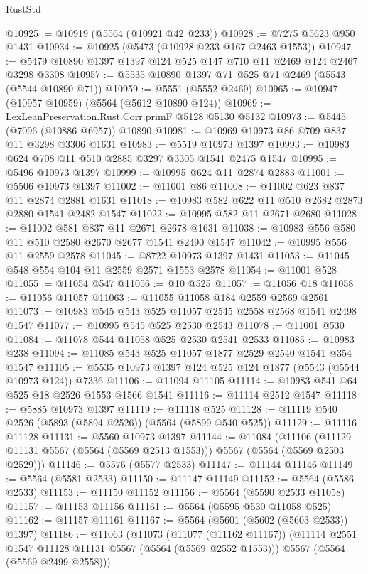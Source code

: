 \begin{lexlean}{RustStd}
\begin{coremodule}
@10925 := @10919 (@5564 (@10921 @42 @233))
@10928 := @7275 @5623 @950 @1431
@10934 := @10925 (@5473 (@10928 @233 @167 @2463 @1553))
@10947 := @5479 @10890 @1397 @1397 @124 @525 @147 @710 @11 @2469 @124 @2467 @3298 @3308
@10957 := @5535 @10890 @1397 @71 @525 @71 @2469 (@5543 (@5544 @10890 @71))
@10959 := @5551 (@5552 @2469)
@10965 := @10947 (@10957 @10959) (@5564 (@5612 @10890 @124))
@10969 := LexLeanPreservation.Rust.Corr.primF @5128 @5130 @5132
@10973 := @5445 (@7096 (@10886 @6957)) @10890
@10981 := @10969 @10973 @86 @709 @837 @11 @3298 @3306 @1631
@10983 := @5519 @10973 @1397
@10993 := @10983 @624 @708 @11 @510 @2885 @3297 @3305 @1541 @2475 @1547
@10995 := @5496 @10973 @1397
@10999 := @10995 @624 @11 @2874 @2883
@11001 := @5506 @10973 @1397
@11002 := @11001 @86
@11008 := @11002 @623 @837 @11 @2874 @2881 @1631
@11018 := @10983 @582 @622 @11 @510 @2682 @2873 @2880 @1541 @2482 @1547
@11022 := @10995 @582 @11 @2671 @2680
@11028 := @11002 @581 @837 @11 @2671 @2678 @1631
@11038 := @10983 @556 @580 @11 @510 @2580 @2670 @2677 @1541 @2490 @1547
@11042 := @10995 @556 @11 @2559 @2578
@11045 := @8722 @10973 @1397 @1431
@11053 := @11045 @548 @554 @104 @11 @2559 @2571 @1553 @2578
@11054 := @11001 @528
@11055 := @11054 @547
@11056 := @10 @525
@11057 := @11056 @18
@11058 := @11056 @11057
@11063 := @11055 @11058 @184 @2559 @2569 @2561
@11073 := @10983 @545 @543 @525 @11057 @2545 @2558 @2568 @1541 @2498 @1547
@11077 := @10995 @545 @525 @2530 @2543
@11078 := @11001 @530
@11084 := @11078 @544 @11058 @525 @2530 @2541 @2533
@11085 := @10983 @238
@11094 := @11085 @543 @525 @11057 @1877 @2529 @2540 @1541 @354 @1547
@11105 := @5535 @10973 @1397 @124 @525 @124 @1877 (@5543 (@5544 @10973 @124)) @7336
@11106 := @11094 @11105
@11114 := @10983 @541 @64 @525 @18 @2526 @1553 @1566 @1541
@11116 := @11114 @2512 @1547
@11118 := @5885 @10973 @1397
@11119 := @11118 @525
@11128 := @11119 @540 @2526 (@5893 (@5894 @2526)) (@5564 (@5899 @540 @525))
@11129 := @11116 @11128
@11131 := @5560 @10973 @1397
@11144 := @11084
    (@11106 (@11129 @11131 @5567 (@5564 (@5569 @2513 @1553))) @5567 (@5564 (@5569 @2503 @2529)))
@11146 := @5576 (@5577 @2533)
@11147 := @11144 @11146
@11149 := @5564 (@5581 @2533)
@11150 := @11147 @11149
@11152 := @5564 (@5586 @2533)
@11153 := @11150 @11152
@11156 := @5564 (@5590 @2533 @11058)
@11157 := @11153 @11156
@11161 := @5564 (@5595 @530 @11058 @525)
@11162 := @11157 @11161
@11167 := @5564 (@5601 (@5602 (@5603 @2533)) @1397)
@11186 := @11063
    (@11073
      (@11077 (@11162 @11167))
      (@11114 @2551 @1547 @11128 @11131 @5567 (@5564 (@5569 @2552 @1553)))
      @5567
      (@5564 (@5569 @2499 @2558)))

\end{coremodule}
\end{lexlean}
